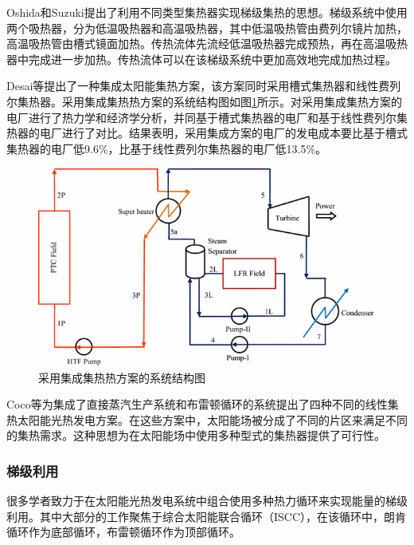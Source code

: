 Oshida和Suzuki\cite{Oshida1987}提出了利用不同类型集热器实现梯级集热的思想。梯级系统中使用两个吸热器，分为低温吸热器和高温吸热器，其中低温吸热管由费列尔镜片加热，高温吸热管由槽式镜面加热。传热流体先流经低温吸热器完成预热，再在高温吸热器中完成进一步加热。传热流体可以在该梯级系统中更加高效地完成加热过程。

Desai等\cite{Desai2015}提出了一种集成太阳能集热方案，该方案同时采用槽式集热器和线性费列尔集热器。采用集成集热热方案的系统结构图如图\ref{fig:Desai2015}所示。对采用集成集热方案的电厂进行了热力学和经济学分析，并同基于槽式集热器的电厂和基于线性费列尔集热器的电厂进行了对比。结果表明，采用集成方案的电厂的发电成本要比基于槽式集热器的电厂低9.6\%，比基于线性费列尔集热器的电厂低13.5\%。

\begin{figure}[!ht]
\centering
\includegraphics[width=.7\textwidth]{fig/Desai2015.jpg}
\caption{采用集成集热热方案的系统结构图}\label{fig:Desai2015}
\end{figure}

Coco等\cite{Coco2015}为集成了直接蒸汽生产系统和布雷顿循环的系统提出了四种不同的线性集热太阳能光热发电方案。在这些方案中，太阳能场被分成了不同的片区来满足不同的集热需求。这种思想为在太阳能场中使用多种型式的集热器提供了可行性。


\subsubsection{梯级利用}

很多学者致力于在太阳能光热发电系统中组合使用多种热力循环来实现能量的梯级利用。其中大部分的工作聚焦于综合太阳能联合循环（ISCC），在该循环中，朗肯循环作为底部循环，布雷顿循环作为顶部循环。


